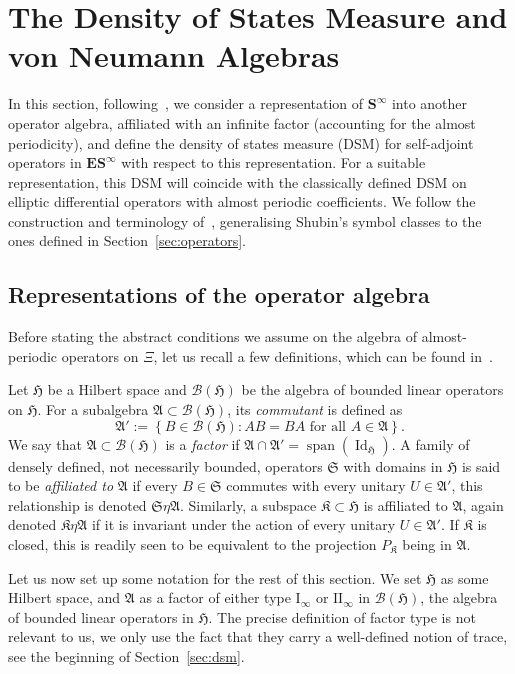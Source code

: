 \documentclass[AHL,Unicode,longabstracts,published]{cedram}
\DeclareMathOperator{\spann}{span}
\DeclareMathOperator{\Id}{Id}
\newcommand{\rmI}{\mathrm{I}}
\newcommand{\rmII}{\mathrm{II}}
\newcommand{\CB}{\mathcal{B}}
\newcommand{\BE}{\mathbf E}
\newcommand{\BS}{\mathbf S}
\newcommand{\FA}{\mathfrak A}
\newcommand{\FH}{\mathfrak H}
\newcommand{\FK}{\mathfrak K}
\newcommand{\FS}{\mathfrak S}
\newcommand{\set}[1]{\left\{ #1 \right\}}
\begin{document}
\section{The Density of States Measure and von Neumann Algebras} \label{sec:ids}


In this section, following~\cite{Shubin1979a}, we consider a representation of $\BS^\infty$ into another operator algebra, affiliated with an infinite factor (accounting for the almost periodicity), and define the density of states measure (DSM) for self-adjoint operators in $\BE\BS^\infty$ with respect to this representation. For a suitable representation, this DSM will coincide with the classically defined DSM on elliptic differential operators with almost periodic coefficients. We follow the construction and terminology of~\cite[\S 1]{Shubin1979a}, generalising Shubin's symbol classes to the ones defined in Section~\ref{sec:operators}.

\subsection{Representations of the operator algebra}

Before stating the abstract conditions we assume on the algebra of almost-periodic operators on $\Xi$, let us recall a few definitions, which can be found in~\cite[\S 34--38]{Naimark}.
\begin{defi}\label{def:vNa}
Let $\FH$ be a Hilbert space and $\CB(\FH)$ be the algebra of bounded linear operators on $\FH$. For a subalgebra $\FA \subset \CB(\FH)$, its
\emph{commutant} is defined as
\begin{equation}
\FA' := \set{B \in \CB(\FH) : AB = BA \text{ for all } A \in \FA}.
\end{equation}
We say that $\FA \subset \CB(\FH)$ is a \emph{factor} if $\FA \cap \FA' =
\spann(\Id_\FH)$. A family of densely defined, not necessarily bounded, operators $\FS$ with domains in $\FH$ is said to be \emph{affiliated to} $\FA$ if every $B \in \FS$ commutes with every unitary $U \in \FA'$, this relationship is denoted $\FS \eta \FA$. Similarly, a subspace $\FK \subset
\FH$ is affiliated to $\FA$, again denoted $\FK \eta \FA$ if it is invariant under the action of every unitary $U \in \FA'$. If $\FK$ is closed, this is readily seen to be equivalent to the projection $P_{\FK}$ being in $\FA$.
\end{defi}

Let us now set up some notation for the rest of this section. We set $\FH$ as some Hilbert space, and $\FA$ as a factor of either type $\rmI_\infty$ or $\rmII_\infty$ in $\CB(\FH)$, the algebra of bounded linear operators in $\FH$. The precise definition of factor type is not relevant to us, we only use the fact that they carry a well-defined notion of trace, see the beginning of Section~\ref{sec:dsm}.
\end{document}
